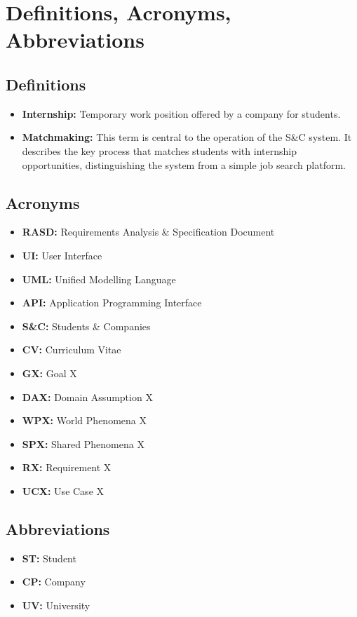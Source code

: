\section{Definitions, Acronyms, Abbreviations}
\label{sec:definitions_acronyms_abbreviations}%

\subsection{Definitions}
\label{subsec:definitions}%
\begin{itemize}
\item \textbf{Internship:} Temporary work position offered by a company for students.
\item \textbf{Matchmaking:} This term is central to the operation of the S\&C system. It describes the key process that matches students with internship opportunities, distinguishing the system from a simple job search platform.
\end{itemize}


\subsection{Acronyms}
\label{subsec:acronyms}%
\begin{itemize}
    \item \textbf{RASD:} Requirements Analysis \& Specification Document 
    \item \textbf{UI:} User Interface
    \item \textbf{UML:} Unified Modelling Language
    \item \textbf{API:} Application Programming Interface
    \item \textbf{S\&C:} Students \& Companies
    \item \textbf{CV:} Curriculum Vitae
    \item \textbf{GX:} Goal X
    \item \textbf{DAX:} Domain Assumption X 
    \item \textbf{WPX:} World Phenomena X
    \item \textbf{SPX:} Shared Phenomena X
    \item \textbf{RX:} Requirement X
    \item \textbf{UCX:} Use Case X
\end{itemize}


\subsection{Abbreviations}
\label{subsec:abbreviations}%
\begin{itemize}
    \item \textbf{ST:} Student
    \item \textbf{CP:} Company
    \item \textbf{UV:} University
\end{itemize}



